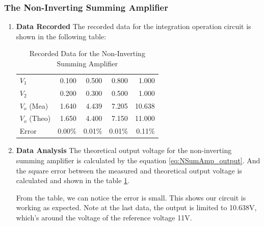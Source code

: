     \subsubsection{The Non-Inverting Summing Amplifier}
    \begin{enumerate}[I]
        \item \textbf{Data Recorded}\newline
            The recorded data for the integration operation circuit is shown in the following table:
            \begin{table}[H]
                \centering
                \begin{tabular}{|l|rrrr|}
                    \toprule
                    $V_1$ & 0.100 & 0.500 & 0.800 & 1.000 \\
                    $V_2$ & 0.200 & 0.300 & 0.500 & 1.000 \\
                    \midrule
                    $V_o$ (Mea) & 1.640 & 4.439 & 7.205 & 10.638 \\
                    \midrule
                    $V_o$ (Theo) & 1.650 & 4.400 & 7.150 & 11.000 \\
                    Error & 0.00\% & 0.01\% & 0.01\% & 0.11\% \\
                    \bottomrule
                    \end{tabular}%
            \caption{Recorded Data for the Non-Inverting Summing Amplifier}
            \label{tab:NSumAmp}                    
            \end{table}
        \item \textbf{Data Analysis}\newline
            The theoretical output voltage for the non-inverting summing amplifier is calculated by the equation \ref{eq:NSumAmp_output}. And the square error between the measured and theoretical output voltage is calculated and shown in the table \ref{tab:NSumAmp}.\par

            From the table, we can notice the error is small. This shows our circuit is working as expected. Note at the last data, the output is limited to 10.638V, which's around the voltage of the reference voltage 11V.\par
    \end{enumerate}

